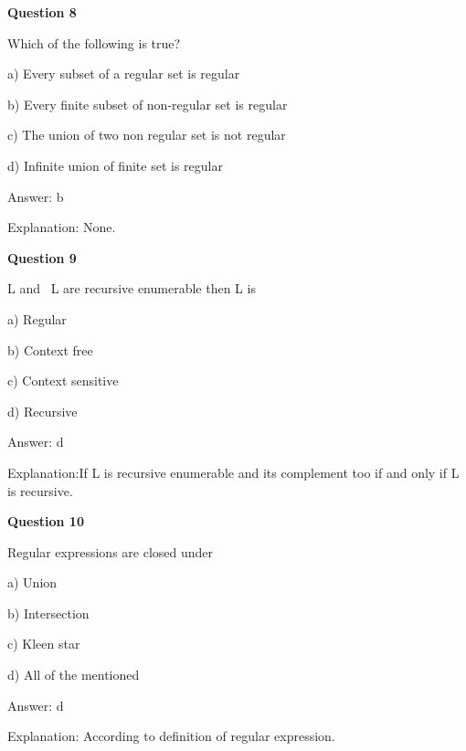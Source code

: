 \documentclass{article}
\begin{document}
\begin{mdframed}[linewidth=1pt, roundcorner=5pt, linecolor=gray!30, backgroundcolor=gray!5]
\textbf{Question 8} 

Which of the following is true?

a) Every subset of a regular set is regular

b) Every finite subset of non-regular set is regular

c) The union of two non regular set is not regular

d) Infinite union of finite set is regular
\vspace{5pt} \par
\begin{tcolorbox}[colback=green!5, colframe=green!40!black, title=Solution]
Answer: b

Explanation: None.
\end{tcolorbox}
\end{mdframed}

\begin{mdframed}[linewidth=1pt, roundcorner=5pt, linecolor=gray!30, backgroundcolor=gray!5]
\textbf{Question 9} 

L and ~L are recursive enumerable then L is

a) Regular

b) Context free

c) Context sensitive

d) Recursive
\vspace{5pt} \par
\begin{tcolorbox}[colback=green!5, colframe=green!40!black, title=Solution]
Answer: d

Explanation:If L is recursive enumerable and its complement too if and only if L is recursive.
\end{tcolorbox}
\end{mdframed}
\newpage

\begin{mdframed}[linewidth=1pt, roundcorner=5pt, linecolor=gray!30, backgroundcolor=gray!5]
\textbf{Question 10} 

Regular expressions are closed under

a) Union

b) Intersection

c) Kleen star

d) All of the mentioned
\vspace{5pt} \par
\begin{tcolorbox}[colback=green!5, colframe=green!40!black, title=Solution]
Answer: d

Explanation: According to definition of regular expression.
\end{tcolorbox}
\end{mdframed}
\newpage
\end{document}
